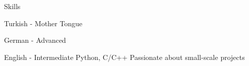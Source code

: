 
\begin{rubric}{Skills}
\entry*[Languages]


Turkish - Mother Tongue

	German - Advanced

    English - Intermediate
    Python, C/C++
	Passionate about small-scale projects
\end{rubric}
